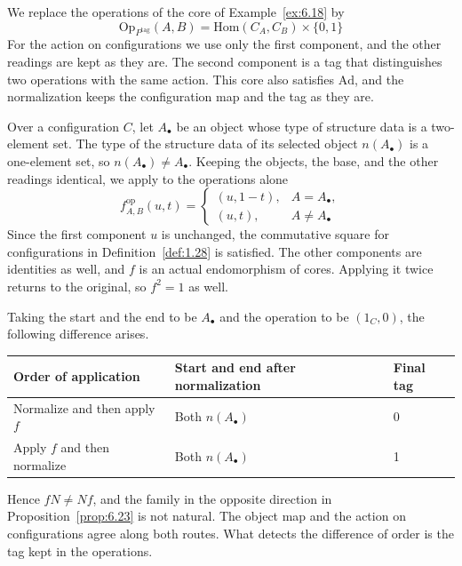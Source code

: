 \begin{example}\label{ex:6.25}

We replace the operations of the core of Example~\ref{ex:6.18} by
\begin{equation*}
\mathrm{Op}_{P^{\mathrm{tag}}}(A,B)
=\mathrm{Hom}(C_A,C_B)\times\{0,1\}
\tag{6.37}\label{eq:6.37}
\end{equation*}
For the action on configurations we use only the first component, and the other readings
are kept as they are.
The second component is a tag that distinguishes two operations with the same action.
This core also satisfies $\mathrm{Ad}$, and the normalization keeps the configuration map
and the tag as they are.

Over a configuration $C$, let $A_\bullet$ be an object whose type of structure data is a
two-element set.
The type of the structure data of its selected object $n(A_\bullet)$ is a one-element set,
so $n(A_\bullet)\ne A_\bullet$.
Keeping the objects, the base, and the other readings identical, we apply to the operations
alone
\begin{equation*}
f^{\mathrm{op}}_{A,B}(u,t)=
\begin{cases}
(u,1-t),&A=A_\bullet,\\
(u,t),&A\ne A_\bullet
\end{cases}
\tag{6.38}\label{eq:6.38}
\end{equation*}
Since the first component $u$ is unchanged, the commutative square for configurations in
Definition~\ref{def:1.28} is satisfied.
The other components are identities as well, and $f$ is an actual endomorphism of cores.
Applying it twice returns to the original, so $f^2=1$ as well.

Taking the start and the end to be $A_\bullet$ and the operation to be $(1_C,0)$, the
following difference arises.

\begin{xltabular}{\linewidth}{@{}LLL@{}}
\toprule
Order of application & Start and end after normalization & Final tag \\
\midrule
\endhead
Normalize and then apply $f$ & Both $n(A_\bullet)$ & 0 \\
\addlinespace[3pt]
Apply $f$ and then normalize & Both $n(A_\bullet)$ & 1 \\
\bottomrule
\end{xltabular}

Hence $fN\ne Nf$, and the family in the opposite direction in Proposition~\ref{prop:6.23}
is not natural.
The object map and the action on configurations agree along both routes.
What detects the difference of order is the tag kept in the operations.


\end{example}
